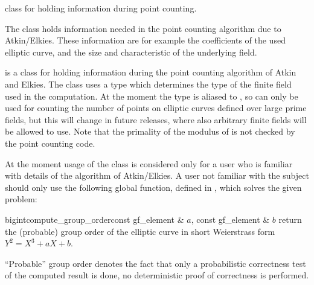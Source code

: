 

\NAME

 \dotfill class for holding information during point counting.



\ABSTRACT

The class  holds information needed in the point counting algorithm
due to Atkin/Elkies.  These information are for example the coefficients of
the used elliptic curve, and the size and characteristic of the underlying
field.



\DESCRIPTION

 is a class for holding information during the point counting algorithm of Atkin
and Elkies.  The class uses a type  which determines the type of the finite
field used in the computation.  At the moment the type  is aliased to
, so  can only be used for counting the number of points on
elliptic curves defined over large prime fields, but this will change in future releases, where
also arbitrary finite fields will be allowed to use.  Note that the primality of the modulus of
 is not checked by the point counting code.

At the moment usage of the class  is considered only for a user who is familiar
with details of the algorithm of Atkin/Elkies.  A user not familiar with the subject should only
use the following global function, defined in , which solves the given
problem:

\begin{fcode}{bigint}{compute_group_order}{const gf_element & $a$, const gf_element & $b$}
  return the (probable) group order of the elliptic curve in short Weierstrass form $Y^2 = X^3 +
  a X +b$.
\end{fcode}

``Probable'' group order denotes the fact that only a probabilistic correctness test of the
computed result is done, no deterministic proof of correctness is performed.

